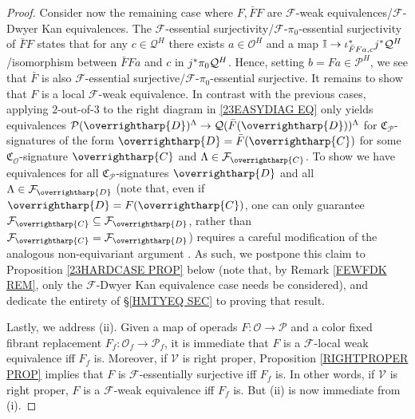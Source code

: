 \documentclass[a4paper,10pt
,draft
]{article}%
\numberwithin{equation}{section}
\numberwithin{figure}{section}
\newtheorem{lemma}[equation]{Lemma}%
\theoremstyle{definition} %
\newcommand{\vect}[1]{\text{\overrightharp{\ensuremath{#1}}}}
\newcommand{\F}{\ensuremath{\mathcal F}}
\newcommand{\V}{\ensuremath{\mathcal V}}
\renewcommand{\O}{\ensuremath{\mathcal O}}
\renewcommand{\P}{\ensuremath{\mathcal P}}
\newcommand{\C}{\ensuremath{\mathcal C}}
\newcommand{\1}{\ensuremath{\mathbbm 1}}%
\begin{document}
\begin{proof}
Consider now the remaining case where
$F,\bar{F}F$ are
$\F$-weak equivalences/$\F$-Dwyer Kan equivalences.
The $\F$-essential surjectivity/$\F$-$\pi_0$-essential surjectivity
of $\bar{F}F$
states that for any $c \in \mathcal{Q}^H$
there exists $a \in \mathcal{O}^H$ and a map
$\mathbb{I} \to \iota^{\**}_{\bar{F}Fa,c} j^{\**}\mathcal{Q}^H$
/isomorphism between $\bar{F}Fa$ and 
$c$ in $j^{\**}\pi_0\mathcal{Q}^H$.
Hence, setting $b = Fa \in \mathcal{P}^H$,
we see that $\bar{F}$ is also
$\F$-essential surjective/$\F$-$\pi_0$-essential surjective.
It remains to show that
$F$ is a local $\F$-weak equivalence.
In contrast with the previous cases,
applying $2$-out-of-$3$ to the right diagram in \eqref{23EASYDIAG EQ}
only yields equivalences 
$\P(\vect{D})^{\Lambda} \to \mathcal{Q}(\bar{F}(\vect{D}))^{\Lambda}$
for $\mathfrak{C}_{\P}$-signatures of the form
$\vect{D} = \bar{F} (\vect{C})$ for some $\mathfrak{C}_{\O}$-signature $\vect{C}$ 
and $\Lambda \in \F_{\vect{C}}$.
To show we have equivalences for all
$\mathfrak{C}_{\P}$-signatures $\vect{D}$
and all $\Lambda \in \F_{\vect{D}}$
(note that, even if $\vect{D} = F(\vect{C})$,
one can only guarantee $\F_{\vect{C}} \subseteq \F_{\vect{D}}$,
rather than $\F_{\vect{C}} = \F_{\vect{D}}$)
requires a careful modification of the analogous non-equivariant argument \cite[Lemma 4.14]{Cav}.
As such, we postpone this claim to 
Proposition \ref{23HARDCASE PROP} below
(note that, by Remark \ref{FEWFDK REM}, 
only the $\F$-Dwyer Kan equivalence case needs be considered),
and dedicate the entirety of \S \ref{HMTYEQ SEC}
to proving that result.


Lastly, we address (ii).
Given a map of operads $F\colon \O \to \P$ and a color fixed fibrant replacement
$F_f \colon \O_f \to \P_f$,
it is immediate that 
$F$ is a $\F$-local weak equivalence iff $F_f$ is.
Moreover, if $\V$ is right proper, Proposition \ref{RIGHTPROPER PROP}
implies that $F$ is $\F$-essentially surjective iff $F_f$ is.
In other words, if $\V$ is right proper,
$F$ is a $\F$-weak equivalence iff $F_f$ is.
But (ii) is now immediate from (i).
\end{proof}



\end{document}
